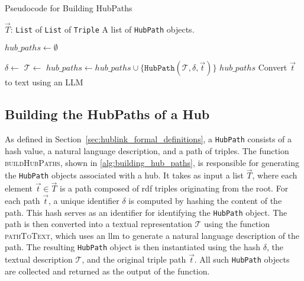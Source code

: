 \begin{algorithm}[ht]
\caption{Pseudocode for Building HubPaths}
\label{alg:building_hub_paths}
\begin{algorithmic}[1]
\Require 
    \Statex $\vec{T}$: \texttt{List} of \texttt{List} of \texttt{Triple} 
\Ensure
    \Statex A list of \texttt{HubPath} objects.

\Statex
{}
    \State $hub\_paths \gets \emptyset$
    
        \State $\delta \gets$  
        \State $\mathcal{T} \gets$ 
        \State $hub\_paths \gets hub\_paths \cup \{\texttt{HubPath}(\mathcal{T}, \delta, \vec{t})\}$
    \EndFor
    \State \Return $hub\_paths$
\EndFunction      
\Statex
{}
    \State \Return Convert $\vec{t}$ to text using an LLM
\EndFunction
\end{algorithmic}
\end{algorithm}

\subsection{Building the HubPaths of a Hub}

As defined in Section~\ref{sec:hublink_formal_definitions}, a \texttt{HubPath} consists of a hash value, a natural language description, and a path of triples. The function \textsc{buildHubPaths}, shown in \autoref{alg:building_hub_paths}, is responsible for generating the \texttt{HubPath} objects associated with a hub. It takes as input a list \(\vec{T}\), where each element \(\vec{t} \in \vec{T}\) is a path composed of \gls{rdf} triples originating from the root. For each path \(\vec{t}\), a unique identifier \(\delta\) is computed by hashing the content of the path. This hash serves as an identifier for identifying the \texttt{HubPath} object. The path is then converted into a textual representation \(\mathcal{T}\) using the function \textsc{pathToText}, which uses an \gls{llm} to generate a natural language description of the path. The resulting \texttt{HubPath} object is then instantiated using the hash \(\delta\), the textual description \(\mathcal{T}\), and the original triple path \(\vec{t}\). All such \texttt{HubPath} objects are collected and returned as the output of the function.



